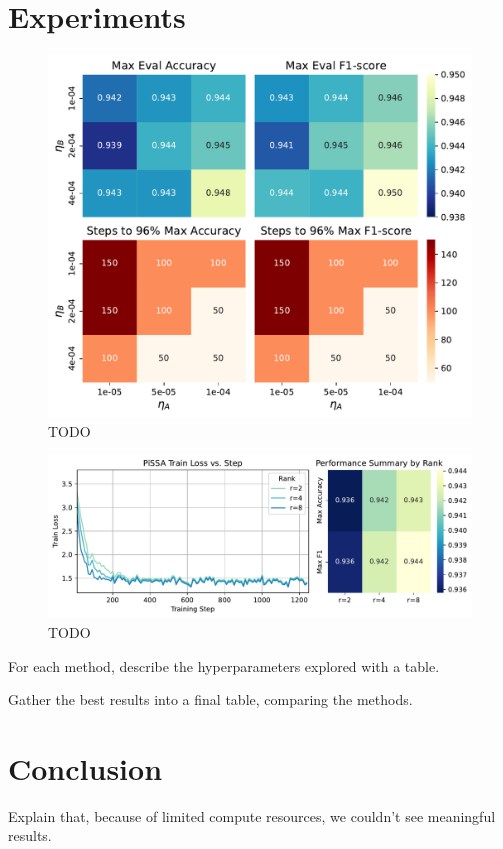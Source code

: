\documentclass[a4paper,10pt,twocolumn,english]{article}
\begin{document}
\section{Experiments}

\begin{figure}[ht]
    \centering
    \includegraphics[width=1\linewidth]{../plots/lora_plus_eval_accuracy_f1_heatmaps_final.pdf}
    \caption{TODO}
    \label{fig:lora_plus}
\end{figure}

\begin{figure}[ht]
    \centering
    \includegraphics[width=1\linewidth]{../plots/pissa_train_loss_vs_step_final_v2.pdf}
    \caption{TODO}
    \label{fig:pissa}
\end{figure}


For each method, describe the hyperparameters explored with a table.

Gather the best results into a final table, comparing the methods.

\section{Conclusion}
Explain that, because of limited compute resources, we couldn't see meaningful results.



\end{document}
